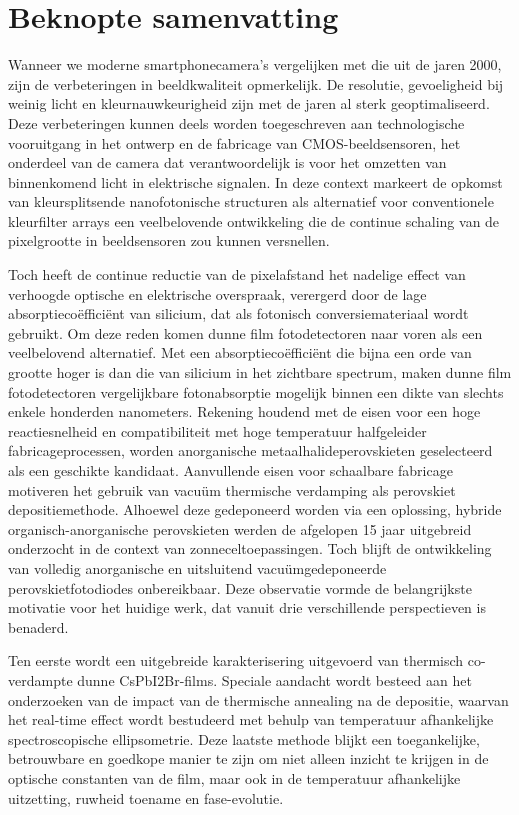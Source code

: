 \chapter{Beknopte samenvatting}

Wanneer we moderne smartphonecamera's vergelijken met die uit de jaren 2000, zijn de verbeteringen in beeldkwaliteit opmerkelijk. De resolutie, gevoeligheid bij weinig licht en kleurnauwkeurigheid zijn met de jaren al sterk geoptimaliseerd. Deze verbeteringen kunnen deels worden toegeschreven aan technologische vooruitgang in het ontwerp en de fabricage van CMOS-beeldsensoren, het onderdeel van de camera dat verantwoordelijk is voor het omzetten van binnenkomend licht in elektrische signalen. In deze context markeert de opkomst van kleursplitsende nanofotonische structuren als alternatief voor conventionele kleurfilter arrays een veelbelovende ontwikkeling die de continue schaling van de pixelgrootte in beeldsensoren zou kunnen versnellen.

Toch heeft de continue reductie van de pixelafstand het nadelige effect van verhoogde optische en elektrische overspraak, verergerd door de lage absorptiecoëfficiënt van silicium, dat als fotonisch conversiemateriaal wordt gebruikt. Om deze reden komen dunne film fotodetectoren naar voren als een veelbelovend alternatief. Met een absorptiecoëfficiënt die bijna een orde van grootte hoger is dan die van silicium in het zichtbare spectrum, maken dunne film fotodetectoren vergelijkbare fotonabsorptie mogelijk binnen een dikte van slechts enkele honderden nanometers. Rekening houdend met de eisen voor een hoge reactiesnelheid en compatibiliteit met hoge temperatuur halfgeleider fabricageprocessen, worden anorganische metaalhalideperovskieten geselecteerd als een geschikte kandidaat. Aanvullende eisen voor schaalbare fabricage motiveren het gebruik van vacuüm thermische verdamping als perovskiet depositiemethode. Alhoewel deze gedeponeerd worden via een oplossing, hybride organisch-anorganische perovskieten werden de afgelopen 15 jaar uitgebreid onderzocht in de context van zonneceltoepassingen. Toch blijft de ontwikkeling van volledig anorganische en uitsluitend vacuümgedeponeerde perovskietfotodiodes onbereikbaar. Deze observatie vormde de belangrijkste motivatie voor het huidige werk, dat vanuit drie verschillende perspectieven is benaderd.

Ten eerste wordt een uitgebreide karakterisering uitgevoerd van thermisch co-verdampte dunne CsPbI2Br-films. Speciale aandacht wordt besteed aan het onderzoeken van de impact van de thermische annealing na de depositie, waarvan het real-time effect wordt bestudeerd met behulp van temperatuur afhankelijke spectroscopische ellipsometrie. Deze laatste methode blijkt een toegankelijke, betrouwbare en goedkope manier te zijn om niet alleen inzicht te krijgen in de optische constanten van de film, maar ook in de temperatuur afhankelijke uitzetting, ruwheid toename en fase-evolutie.

